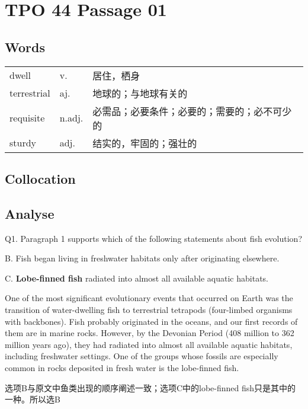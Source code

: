 \section{TPO 44 Passage 01}

\subsection{Words}

\begin{tabular}{lll}
    dwell       & v.     & 居住，栖身                  \\
    terrestrial & aj.    & 地球的；与地球有关的             \\
    requisite   & n.adj. & 必需品；必要条件；必要的；需要的；必不可少的 \\
    sturdy      & adj.   & 结实的，牢固的；强壮的            \\
\end{tabular}

\subsection{Collocation}


\subsection{Analyse}

\begin{blk}
    \begin{qst}
        Q1. Paragraph 1 supports which of the following statements about fish evolution?
    \end{qst}

    \begin{chc}
        B. Fish began living in freshwater habitats only after originating elsewhere.

        C. \textbf{Lobe-finned fish} radiated into almost all available aquatic habitats.
    \end{chc}

    \begin{psgq}
        One of the most significant evolutionary events that occurred on Earth was the transition of water-dwelling fish to terrestrial tetrapods (four-limbed organisms with backbones). Fish probably originated in the oceans, and our first records of them are in marine rocks. However, by the Devonian Period (408 million to 362 million years ago), they had radiated into almost all available aquatic habitats, including freshwater settings. One of the groups whose fossils are especially common in rocks deposited in fresh water is the lobe-finned fish.
    \end{psgq}

    \begin{nlz}
        选项B与原文中鱼类出现的顺序阐述一致；选项C中的lobe-finned fish只是其中的一种。所以选B
    \end{nlz}
\end{blk}

